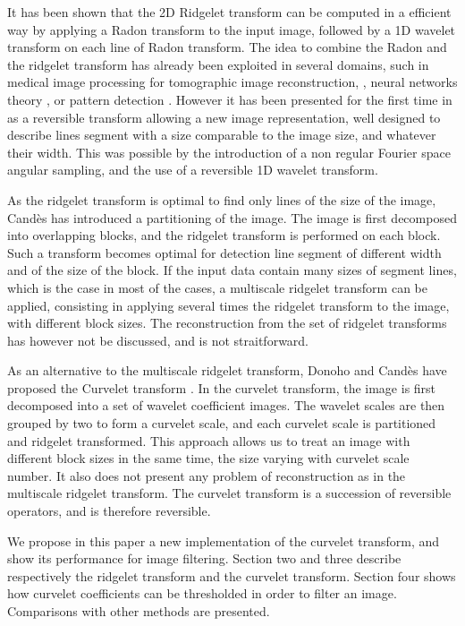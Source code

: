 \documentclass{article}
\begin{document}
It has been shown  \cite{cur:candes98} that the 2D Ridgelet transform can be
computed in a efficient way by applying a Radon transform to the input
image, followed  by a 1D wavelet transform on each line of Radon transform.
The idea to combine the Radon and the ridgelet transform has already
been exploited in several domains, such in medical image processing
for tomographic image reconstruction, 
\cite{cur:sahiner98,cur:olson94,cur:zhao97}, 
neural networks theory \cite{cur:meir98}, 
or pattern detection \cite{cur:magli97,cur:magli99}. However 
it has been presented for the first time in \cite{cur:candes98} as a
reversible transform allowing a new image representation, well designed  
to describe lines segment with a size comparable to the image size, 
and whatever their width. This was possible by the
introduction of a non regular Fourier space angular sampling, and
the use of a reversible 1D wavelet transform.

As the ridgelet transform is optimal to find only lines of the size of the image,
Cand\`es \cite{cur:candes98} has introduced a partitioning of the image.
The image is first decomposed into overlapping blocks, and the 
ridgelet transform is performed on each block. Such a transform becomes
optimal for detection line  segment of different width
and  of the size of the block. If the input data contain many sizes of
segment lines, which is the case in most of the cases, a multiscale 
ridgelet transform can be applied, consisting in applying 
several times the ridgelet 
transform to the image, with different block sizes. The reconstruction
from the set of ridgelet transforms has however not be discussed, and 
is not straitforward.

As an alternative to the multiscale ridgelet transform, Donoho  and 
Cand\`es have proposed the Curvelet transform 
\cite{cur:candes99_3,cur:donoho99}. In the curvelet transform, the 
image is first decomposed into a set of wavelet coefficient images.
The wavelet scales are then grouped by two to form a curvelet scale, 
and each curvelet scale is partitioned and ridgelet transformed.
This approach allows us to treat an image with different block sizes
in the same time, the size varying with curvelet scale number. 
It also does not present any problem of reconstruction as in the
multiscale ridgelet transform. The curvelet transform is a succession
of reversible operators, and is therefore reversible.

We propose in this paper a new implementation of the curvelet transform,
and show its performance for image filtering.
Section two and three describe respectively
the ridgelet transform and the curvelet transform.
Section four shows how curvelet coefficients can be
thresholded in order to filter an image. Comparisons with other methods
are presented. 
\end{document}
